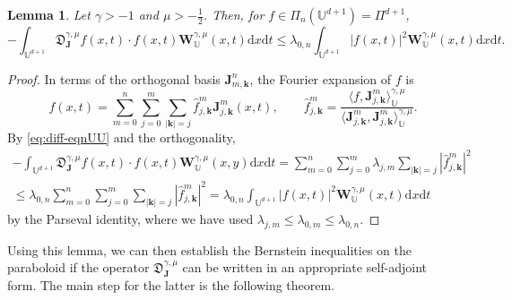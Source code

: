 \documentclass{amsart}
\newtheorem{lem}[thm]{Lemma}
\theoremstyle{remark}
\def\la{{\langle}}
\def\ra{{\rangle}}
\def\d{\mathrm{d}}
\def\fD{{\mathfrak D}}
\def\g{{\gamma}}
\def\l{{\lambda}}
\def\la{{\langle}}
\def\ra{{\rangle}}
\def\kb{{\mathbf k}}
\def\Jb{{\mathbf J}}
\def\Wb{{\mathbf W}}
\def\UU{{\mathbb U}}
\newcommand{\wh}{\widehat}
\def\f{\frac}
\begin{document}
\begin{lem}\label{lem:mainUU}
Let $\g > -1$ and $\mu > -\f12$. Then, for $f \in \Pi_n(\UU^{d+1}) = \Pi^{d+1}$, 
$$
  - \int_{\UU^{d+1}} \fD_{\Jb}^{\g,\mu} f(x,t) \cdot f(x,t) \Wb_{\UU}^{\g,\mu} (x,t) \d x \d t 
       \le  \lambda_{0,n} \int_{\UU^{d+1}} |f(x,t)|^2 \Wb_{\UU}^{\g,\mu} (x,t) \d x \d t.
$$
\end{lem}

\begin{proof}
In terms of the orthogonal basis $\Jb_{m,\kb}^n$, the Fourier expansion of $f$ is 
$$
  f(x,t) =  \sum_{m=0}^n \sum_{j=0}^m \sum_{|\kb| = j} \wh f_{j, \kb}^m \Jb_{j,\kb}^m(x,t), \qquad \wh f_{j,\kb}^m 
     = \frac{\la f, \Jb_{j,\kb}^m\ra_\UU^{\g,\mu}}{\la \Jb_{j,\kb}^m, \Jb_{j,\kb}^m\ra_\UU^{\g,\mu}}.
$$
By \eqref{eq:diff-eqnUU} and the orthogonality, 
\begin{align*}
   - \int_{\UU^{d+1}} \fD_{\Jb}^{\g,\mu} f(x,t) \cdot f(x,t) \Wb_\UU^{\g,\mu}(x,y) \d x \d t
     = \sum_{m=0}^n \sum_{j=0}^m  \l_{j, m} \sum_{|\kb| = j} \left| \wh f_{j, \kb}^m \right|^2 \\
     \le \l_{0,n} \sum_{m=0}^n \sum_{j=0}^m  \sum_{|\kb| = j} \left| \wh f_{j, \kb}^m \right|^2
     = \l_{0,n} \int_{\UU^{d+1}} |f(x,t)|^2 \Wb_{\UU}^{\g,\mu} (x,t) \d x \d t
\end{align*}
by the Parseval identity, where we have used $\l_{j,m} \le \l_{0,m} \le \l_{0,n}$. 
\end{proof}

Using this lemma, we can then establish the Bernstein inequalities on the paraboloid if the operator 
$\fD_{\Jb}^{\g,\mu}$ can be written in an appropriate self-adjoint form. The main step for the latter
is the following theorem. 
\end{document}
